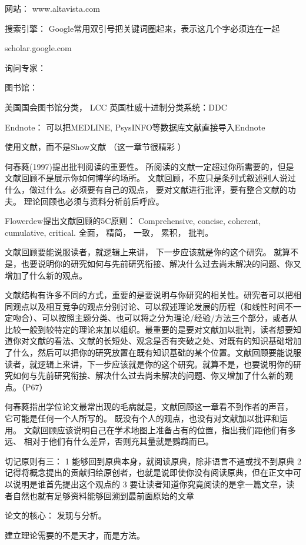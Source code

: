 网站：  www.altavista.com

搜索引擎：  Google常用双引号把关键词圈起来，表示这几个字必须连在一起

scholar.google.com

询问专家： 

图书馆：

美国国会图书馆分类， LCC
英国杜威十进制分类系统：DDC

Endnote： 
可以把MEDLINE, PsysINFO等数据库文献直接导入Endnote


使用文献，而不是Show文献
（这一章节很精彩 ）


何春蕤(1997)提出批判阅读的重要性。
所阅读的文献一定超过你所需要的，但是文献回顾不是展示你如何博学的场所。
文献回顾，不应只是条列式叙述别人说过什么，做过什么。必须要有自己的观点，
要对文献进行批评，要有整合文献的功夫。
理论回顾也必须与资料分析前后呼应。

Flowerdew提出文献回顾的5C原则： 
Comprehensive, concise, coherent, cumulative, critical.
全面，  精简， 一致， 累积， 批判。

文献回顾要能说服读者，就逻辑上来讲， 下一步应该就是你的这个研究。
就算不是，也要说明你的研究如何与先前研究衔接、解决什么过去尚未解决的问题、你又增加了什么新的观点。

文献结构有许多不同的方式，重要的是要说明与你研究的相关性。研究者可以把相同观点以及相互竞争的观点分别讨论、可以叙述理论发展的历程（和线性时间不一定吻合）、可以按照主题分类、也可以将之分为理论/经验/方法三个部分，或者从比较一般到较特定的理论来加以组织。最重要的是要对文献加以批判，读者想要知道你对文献的看法、文献的长短处、观念是否有突破之处、对既有的知识基础增加了什么，然后可以把你的研究放置在既有知识基础的某个位置。文献回顾要能说服读者，就逻辑上来讲，下一步应该就是你的这个研究。就算不是，也要说明你的研究如何与先前研究衔接、解决什么过去尚未解决的问题、你又增加了什么新的观点。（P67）


何春蕤指出学位论文最常出现的毛病就是，文献回顾这一章看不到作者的声音，
它可能是任何一个人所写的。
既没有个人的观点，也没有对文献加以批评和运用。
文献回顾应该说明自己在学术地图上准备占有的位置，指出我们距他们有多远、
相对于他们有什么差异，否则充其量就是鹦鹉而已。

切记原则有三：
1 能够回到原典本身，就阅读原典，除非语言不通或找不到原典
2 记得将概念提出的贡献归给原创者，也就是说即使你没有阅读原典，但在正文中可以说明是谁首先提出这个观点的
3 要让读者知道你究竟阅读的是拿一篇文章，读者自然也就有足够资料能够回溯到最前面原始的文章

论文的核心： 发现与分析。

建立理论需要的不是天才，而是方法。

